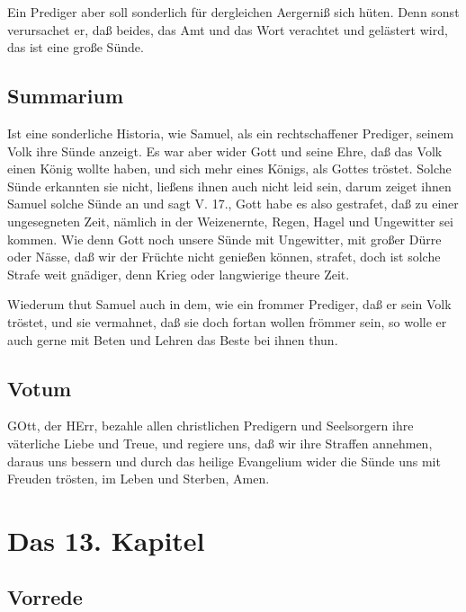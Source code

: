 Ein Prediger aber soll sonderlich für dergleichen Aergerniß sich hüten. Denn sonst verursachet er, daß beides, das Amt und das Wort verachtet und gelästert wird, das ist eine große Sünde.

\section{Summarium}

Ist eine sonderliche Historia, wie Samuel, als ein rechtschaffener Prediger, seinem Volk ihre Sünde anzeigt. Es war aber wider Gott und seine Ehre, daß das Volk einen König wollte haben, und sich mehr eines Königs, als Gottes tröstet. Solche Sünde erkannten sie nicht, ließens ihnen auch nicht leid sein, darum zeiget ihnen Samuel solche Sünde an und sagt V. 17., Gott habe es also gestrafet, daß zu einer ungesegneten Zeit, nämlich in der Weizenernte, Regen, Hagel und Ungewitter sei kommen. Wie denn Gott noch unsere Sünde mit Ungewitter, mit großer Dürre oder Nässe, daß wir der Früchte nicht genießen können, strafet, doch ist solche Strafe weit gnädiger, denn Krieg oder langwierige theure Zeit.

Wiederum thut Samuel auch in dem, wie ein frommer Prediger, daß er sein Volk tröstet, und sie vermahnet, daß sie doch fortan wollen frömmer sein, so wolle er auch gerne mit Beten und Lehren das Beste bei ihnen thun.

\section{Votum}

GOtt, der HErr, bezahle allen christlichen Predigern und Seelsorgern ihre väterliche
Liebe und Treue, und regiere uns, daß wir ihre Straffen annehmen, daraus uns bessern und durch das heilige Evangelium wider die Sünde uns mit Freuden trösten, im Leben und Sterben, Amen.

\chapter{Das 13. Kapitel}

\section{Vorrede}

